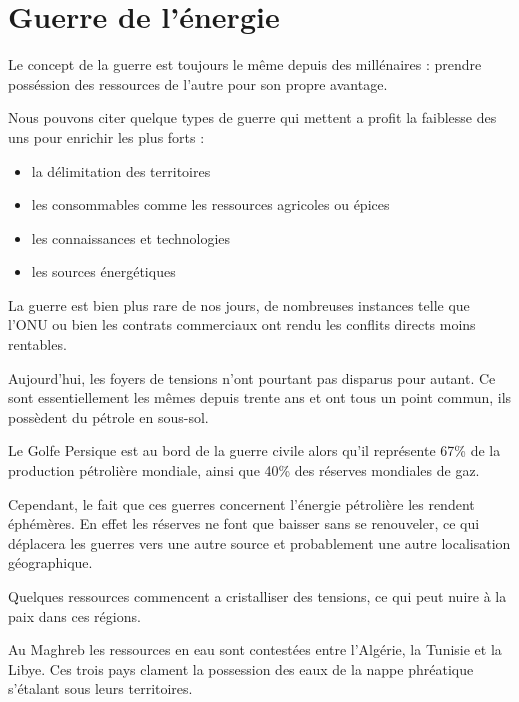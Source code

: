 \section{Guerre de l'énergie}
\vskip -15pt

Le concept de la guerre est toujours le même depuis des millénaires : prendre posséssion des
ressources de l'autre pour son propre avantage.

Nous pouvons citer quelque types de guerre qui mettent a profit la faiblesse des uns
pour enrichir les plus forts :

\begin{itemize}
  \item la délimitation des territoires %
  \item les consommables comme les ressources agricoles ou épices
  \item les connaissances et technologies
  \item les sources énergétiques
\end{itemize}

La guerre est bien plus rare de nos jours, de nombreuses instances telle que l'ONU ou bien les
contrats commerciaux ont rendu les conflits directs moins rentables.

Aujourd'hui, les foyers de tensions n’ont pourtant pas disparus pour autant.
Ce sont essentiellement les mêmes depuis trente ans et ont tous un point commun,
ils possèdent du pétrole en sous-sol.

Le Golfe Persique est au bord de la guerre civile alors qu'il représente 67\%
de la production pétrolière mondiale, ainsi que 40\% des réserves mondiales de gaz.

Cependant, le fait que ces guerres concernent l'énergie pétrolière les rendent éphémères.
En effet les réserves ne font que baisser sans se renouveler, ce qui déplacera les
guerres vers une autre source et probablement une autre localisation géographique.

Quelques ressources commencent a cristalliser des tensions, ce qui peut nuire à la paix
dans ces régions.

Au Maghreb les ressources en eau sont contestées entre l'Algérie, la Tunisie et la Libye. Ces
trois pays clament la possession des eaux de la nappe phréatique s'étalant sous leurs
territoires.

